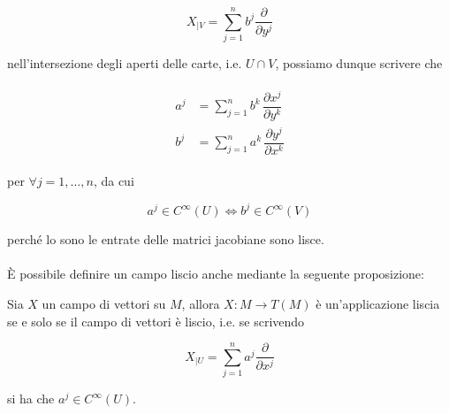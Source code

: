 \begin{equation}
	X_{|V} = \sum_{j=1}^{n} b^{j} \dfrac{\partial}{\partial y^{j}} 
\end{equation}

nell'intersezione degli aperti delle carte, i.e. $ U \cap V $, possiamo dunque scrivere che

\begin{align}
	\begin{split}
		a^{j} &= \sum_{j=1}^{n} b^{k} \, \dfrac{\partial x^{j}}{\partial y^{k}}\\
		b^{j} &= \sum_{j=1}^{n} a^{k} \, \dfrac{\partial y^{j}}{\partial x^{k}}
	\end{split}
\end{align}

per $ \forall j=1,\dots,n $, da cui

\begin{equation}
	a^{j} \in C^{\infty}(U) \iff b^{j} \in C^{\infty}(V)
\end{equation}

perché lo sono le entrate delle matrici jacobiane sono lisce.\\\\
%
\`{E} possibile definire un campo liscio anche mediante la seguente proposizione:

\begin{definition}
	Sia $ X $ un campo di vettori su $ M $, allora $ X : M \to T(M) $ è un'applicazione liscia se e solo se il campo di vettori è liscio, i.e. se scrivendo
	
	\begin{equation}
		X_{|U} = \sum_{j=1}^{n} a^{j} \dfrac{\partial}{\partial x^{j}}
	\end{equation}

	si ha che $ a^{j} \in C^{\infty}(U) $.
\end{definition}

